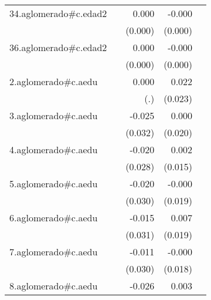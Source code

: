 {\begin{longtable}{l*{4}{D{.}{.}{-1}}}
\addlinespace
34.aglomerado#c.edad2&                     &       0.000         &      -0.000         &                     \\
            &                     &     (0.000)         &     (0.000)         &                     \\
\addlinespace
36.aglomerado#c.edad2&                     &       0.000         &      -0.000         &                     \\
            &                     &     (0.000)         &     (0.000)         &                     \\
\addlinespace
2.aglomerado#c.aedu&                     &       0.000         &       0.022         &                     \\
            &                     &         (.)         &     (0.023)         &                     \\
\addlinespace
3.aglomerado#c.aedu&                     &      -0.025         &       0.000         &                     \\
            &                     &     (0.032)         &     (0.020)         &                     \\
\addlinespace
4.aglomerado#c.aedu&                     &      -0.020         &       0.002         &                     \\
            &                     &     (0.028)         &     (0.015)         &                     \\
\addlinespace
5.aglomerado#c.aedu&                     &      -0.020         &      -0.000         &                     \\
            &                     &     (0.030)         &     (0.019)         &                     \\
\addlinespace
6.aglomerado#c.aedu&                     &      -0.015         &       0.007         &                     \\
            &                     &     (0.031)         &     (0.019)         &                     \\
\addlinespace
7.aglomerado#c.aedu&                     &      -0.011         &      -0.000         &                     \\
            &                     &     (0.030)         &     (0.018)         &                     \\
\addlinespace
8.aglomerado#c.aedu&                     &      -0.026         &       0.003         &                     \\

\end{longtable}}
